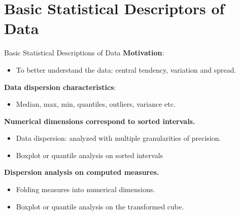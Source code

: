 \section{Basic Statistical Descriptors of Data}

\begin{frame}{Basic Statistical Descriptions of Data}
  \textbf{Motivation}:
  \begin{itemize}
  \item To better understand the data: central tendency, variation and spread.
  \end{itemize}

  \textbf{Data dispersion characteristics}:
  \begin{itemize}
  \item Median, max, min, quantiles, outliers, variance etc.
  \end{itemize}

  \textbf{Numerical dimensions correspond to sorted intervals.}\\
  \begin{itemize}
  \item Data dispersion: analyzed with multiple granularities of precision.
  \item Boxplot or quantile analysis on sorted intervals
  \end{itemize}

  \textbf{Dispersion analysis on computed measures.}\\
  \begin{itemize}
  \item Folding measures into numerical dimensions.
  \item Boxplot or quantile analysis on the transformed cube.
  \end{itemize}
\end{frame}

